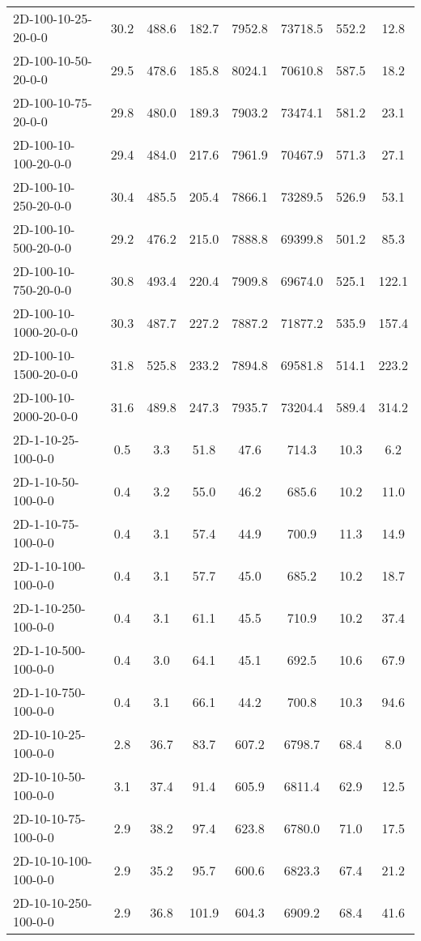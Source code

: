 \documentclass{article}
\begin{document}
\begin{center}
\begin{table}[h]
\begin{tabular}{|l||c|c|c|c|c|c|c|}
    \hline
    2D-100-10-25-20-0-0 & 30.2 & 488.6 & 182.7 & 7952.8 & 73718.5 & 552.2 & 12.8 \\
    2D-100-10-50-20-0-0 & 29.5 & 478.6 & 185.8 & 8024.1 & 70610.8 & 587.5 & 18.2 \\
    2D-100-10-75-20-0-0 & 29.8 & 480.0 & 189.3 & 7903.2 & 73474.1 & 581.2 & 23.1 \\
    2D-100-10-100-20-0-0 & 29.4 & 484.0 & 217.6 & 7961.9 & 70467.9 & 571.3 & 27.1 \\
    2D-100-10-250-20-0-0 & 30.4 & 485.5 & 205.4 & 7866.1 & 73289.5 & 526.9 & 53.1 \\
    2D-100-10-500-20-0-0 & 29.2 & 476.2 & 215.0 & 7888.8 & 69399.8 & 501.2 & 85.3 \\
    2D-100-10-750-20-0-0 & 30.8 & 493.4 & 220.4 & 7909.8 & 69674.0 & 525.1 & 122.1 \\
    2D-100-10-1000-20-0-0 & 30.3 & 487.7 & 227.2 & 7887.2 & 71877.2 & 535.9 & 157.4 \\
    2D-100-10-1500-20-0-0 & 31.8 & 525.8 & 233.2 & 7894.8 & 69581.8 & 514.1 & 223.2 \\
    2D-100-10-2000-20-0-0 & 31.6 & 489.8 & 247.3 & 7935.7 & 73204.4 & 589.4 & 314.2 \\
    \hline
    2D-1-10-25-100-0-0 & 0.5 & 3.3 & 51.8 & 47.6 & 714.3 & 10.3 & 6.2 \\
    2D-1-10-50-100-0-0 & 0.4 & 3.2 & 55.0 & 46.2 & 685.6 & 10.2 & 11.0 \\
    2D-1-10-75-100-0-0 & 0.4 & 3.1 & 57.4 & 44.9 & 700.9 & 11.3 & 14.9 \\
    2D-1-10-100-100-0-0 & 0.4 & 3.1 & 57.7 & 45.0 & 685.2 & 10.2 & 18.7 \\
    2D-1-10-250-100-0-0 & 0.4 & 3.1 & 61.1 & 45.5 & 710.9 & 10.2 & 37.4 \\
    2D-1-10-500-100-0-0 & 0.4 & 3.0 & 64.1 & 45.1 & 692.5 & 10.6 & 67.9 \\
    2D-1-10-750-100-0-0 & 0.4 & 3.1 & 66.1 & 44.2 & 700.8 & 10.3 & 94.6 \\
    \hline
    2D-10-10-25-100-0-0 & 2.8 & 36.7 & 83.7 & 607.2 & 6798.7 & 68.4 & 8.0 \\
    2D-10-10-50-100-0-0 & 3.1 & 37.4 & 91.4 & 605.9 & 6811.4 & 62.9 & 12.5 \\
    2D-10-10-75-100-0-0 & 2.9 & 38.2 & 97.4 & 623.8 & 6780.0 & 71.0 & 17.5 \\
    2D-10-10-100-100-0-0 & 2.9 & 35.2 & 95.7 & 600.6 & 6823.3 & 67.4 & 21.2 \\
    2D-10-10-250-100-0-0 & 2.9 & 36.8 & 101.9 & 604.3 & 6909.2 & 68.4 & 41.6 \\

\end{tabular}
\end{table}
\end{center}
\end{document}
